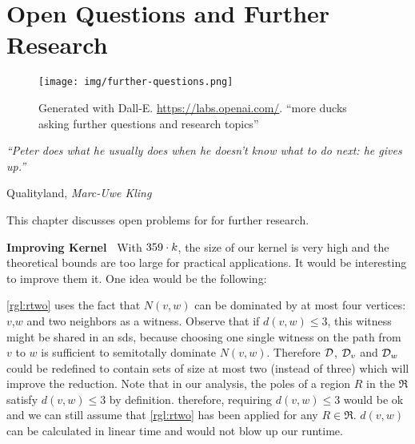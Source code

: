 \chapter{Open Questions and Further Research}\label{ch:closing}

\vspace*{-50pt}

\begin{figure}[ht]
        \texttt{[image: img/further-questions.png]}
        \captionsetup{textformat=empty,labelformat=blank}
        \caption[Generated with Dalle-E. Knowledge Cutoff 09-2022]{Generated with Dall-E. \url{https://labs.openai.com/}. ``more ducks asking further questions and research topics''}
\end{figure}

\epigraph{\itshape ``Peter does what he usually does when he doesn’t know what to do next: he gives up.''}{Qualityland, \textit{Marc-Uwe Kling}}

This chapter discusses open problems for \sdom for further research.

\noindent \textbf{Improving Kernel~}
With $359 \cdot k$, the size of our kernel is very high and the theoretical bounds are too large for practical applications. 
It would be interesting to improve them it. 
One idea would be the following:

\cref{rgl:rtwo} uses the fact that $N(v,w)$ can be dominated by at most four vertices: $v$,$w$ and two neighbors as a witness.
Observe that if $d(v,w) \leq 3$, this witness might be shared in an sds, because choosing one single witness on the path from $v$ to $w$ is sufficient to semitotally dominate $N(v,w)$.
Therefore $\mathcal{D}$, $\mathcal{D}_{v}$ and $\mathcal{D}_{w}$ could be redefined to contain sets of size at most two (instead of three) which will improve the reduction. 
Note that in our analysis, the poles of a region $R$ in the \dreg $\mathfrak{R}$ satisfy $d(v,w) \leq 3$ by definition.
therefore, requiring $d(v,w) \leq 3$ would be ok and we can still assume that \cref{rgl:rtwo} has been applied for any $R \in \mathfrak{R}$.
$d(v,w)$ can be calculated in linear time and would not blow up our runtime.

